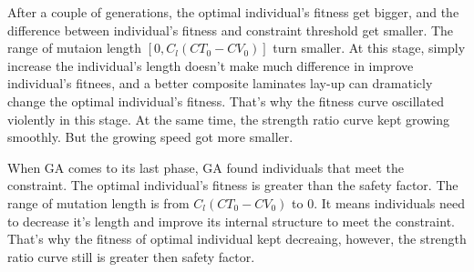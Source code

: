 \documentclass{article}
\begin{document}
After a couple of generations, the optimal individual's fitness get bigger, and the difference
between individual's fitness and constraint threshold get smaller. The range of mutaion length $[0,
C_l(CT_0 - CV_0)]$ turn smaller. At this stage, simply increase the individual's length doesn't make
much difference in improve individual's fitnees, and a better composite laminates lay-up can
dramaticly change the optimal individual's fitness. That's why the fitness curve oscillated
violently in this stage.  At the same time, the strength ratio curve kept growing smoothly. But the
growing speed got more smaller.

When GA comes to its last phase, GA found individuals that meet the constraint. The optimal
individual's fitness is greater than the safety factor. The range of mutation length is from 
$C_l(CT_0 - CV_0)$ to 0. It means individuals need to decrease it's length and improve its internal
structure to meet the constraint. That's why the fitness of optimal individual kept decreaing,
however, the strength ratio curve still is greater then safety factor.
\end{document}
